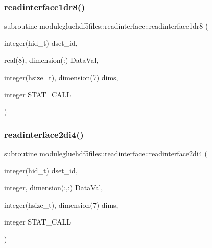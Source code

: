 \subsubsection{\texorpdfstring{readinterface1dr8()}{readinterface1dr8()}}
{\footnotesize\ttfamily subroutine modulegluehdf5files\+::readinterface\+::readinterface1dr8 (\begin{DoxyParamCaption}\item[{integer(hid\+\_\+t)}]{dset\+\_\+id,  }\item[{real(8), dimension(\+:)}]{Data\+Val,  }\item[{integer(hsize\+\_\+t), dimension(7)}]{dims,  }\item[{integer}]{S\+T\+A\+T\+\_\+\+C\+A\+LL }\end{DoxyParamCaption})\hspace{0.3cm}{\ttfamily [private]}}

\mbox{\label{interfacemodulegluehdf5files_1_1readinterface_a23373e04b343bf506f88f4250ddb3653}} 
\subsubsection{\texorpdfstring{readinterface2di4()}{readinterface2di4()}}
{\footnotesize\ttfamily subroutine modulegluehdf5files\+::readinterface\+::readinterface2di4 (\begin{DoxyParamCaption}\item[{integer(hid\+\_\+t)}]{dset\+\_\+id,  }\item[{integer, dimension(\+:,\+:)}]{Data\+Val,  }\item[{integer(hsize\+\_\+t), dimension(7)}]{dims,  }\item[{integer}]{S\+T\+A\+T\+\_\+\+C\+A\+LL }\end{DoxyParamCaption})\hspace{0.3cm}{\ttfamily [private]}}

\mbox{\label{interfacemodulegluehdf5files_1_1readinterface_a4373884420ee0383c19986206c445dd1}} 
